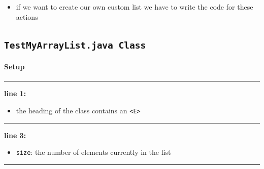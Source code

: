 \begin{itemize}
    \item if we want to create our own custom list we have to write the code for these actions
\end{itemize}

\subsection{\texttt{TestMyArrayList.java Class}}


\paragraph*{Setup}


\vspace{0.1cm}
\noindent
\textcolor{RedOrange}{\rule{\textwidth}{0.5pt}}
\vspace{-0.1cm}

\noindent
\begin{minipage}{0.15\textwidth}
    \textcolor{RedOrange}{\textbf{line 1:}}
\end{minipage}
\begin{minipage}{0.85\textwidth}
    \begin{itemize}
        \item[] the heading of the class contains an \texttt{<E>}
    \end{itemize}
\end{minipage}

\vspace{0.1cm}
\noindent
\textcolor{RedOrange}{\rule{\textwidth}{0.5pt}}
\vspace{-0.1cm}

\noindent
\begin{minipage}{0.15\textwidth}
    \textcolor{RedOrange}{\textbf{line 3:}}
\end{minipage}
\begin{minipage}{0.85\textwidth}
    \begin{itemize}
        \item[] \texttt{size}: the number of elements currently in the list 
    \end{itemize}
\end{minipage}

\vspace{0.1cm}
\noindent
\textcolor{RedOrange}{\rule{\textwidth}{0.5pt}}
\vspace{-0.1cm}

